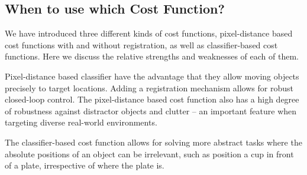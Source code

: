\subsection{When to use which Cost Function?}
\label{subsec:cost_discuission}

We have introduced three different kinds of cost functions, pixel-distance based cost functions with and without registration, as well as classifier-based cost functions. Here we discuss the relative strengths and weaknesses of each of them.

Pixel-distance based classifier have the advantage that they allow moving objects precisely to target locations. Adding a registration mechanism allows for robust closed-loop control. The pixel-distance based cost function also has a high degree of robustness against distractor objects and clutter -- an important feature when targeting diverse real-world environments.

The classifier-based cost function allows for solving more abstract tasks where the absolute positions of an object can be irrelevant, such as position a cup in front of a plate, irrespective of where the plate is.
